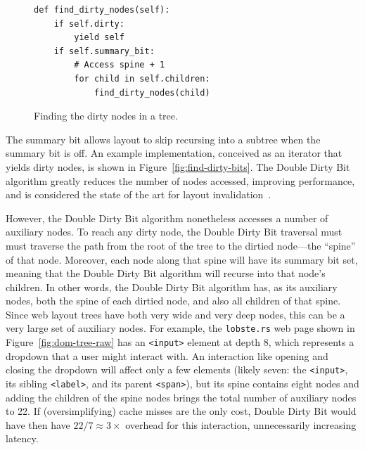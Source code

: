 \begin{figure}
\begin{minipage}[t]{0.4\linewidth}
\scriptsize
\begin{verbatim}
def find_dirty_nodes(self):
    if self.dirty:
        yield self
    if self.summary_bit:
        # Access spine + 1
        for child in self.children:
            find_dirty_nodes(child)
\end{verbatim}
\end{minipage}\hfill%
\begin{minipage}[t]{0.6\linewidth}
\caption{Finding the dirty nodes in a tree.}
\label{fig:find-dirty-nodes}
\end{minipage}
\end{figure}

The summary bit allows layout to skip recursing into a subtree
  when the summary bit is off.
An example implementation, conceived as an iterator
  that yields dirty nodes,
  is shown in Figure~\ref{fig:find-dirty-bits}.
The Double Dirty Bit algorithm
  greatly reduces the number of nodes accessed,
  improving performance,
  and is considered the state of the art
  for layout invalidation~\cite{tali-garseil,wbe}.

However, the Double Dirty Bit algorithm
  nonetheless accesses a number of auxiliary nodes.
To reach any dirty node,
  the Double Dirty Bit traversal must
  must traverse the path from the root of the tree
  to the dirtied node---the ``spine'' of that node.
Moreover, each node along that spine
  will have its summary bit set,
  meaning that the Double Dirty Bit algorithm will recurse
  into that node's children.
In other words,
  the Double Dirty Bit algorithm has, as its auxiliary nodes,
  both the spine of each dirtied node,
  and also all children of that spine.
Since web layout trees have both very wide and very deep nodes,
  this can be a very large set of auxiliary nodes.
For example, the \texttt{lobste.rs} web page
  shown in Figure~\ref{fig:dom-tree-raw}
  has an \texttt{<input>} element at depth 8,
  which represents a dropdown that a user might interact with.
An interaction like opening and closing the dropdown
  will affect only a few elements
  (likely seven:
    the \texttt{<input>},
    its sibling \texttt{<label>},
    and its parent \texttt{<span>}),
  but its spine contains eight nodes
  and adding the children of the spine nodes
  brings the total number of auxiliary nodes to 22.
If (oversimplifying) cache misses are the only cost,
  Double Dirty Bit would have then have
  $22 / 7 \approx 3\times$ overhead for this interaction,
  unnecessarily increasing latency.


